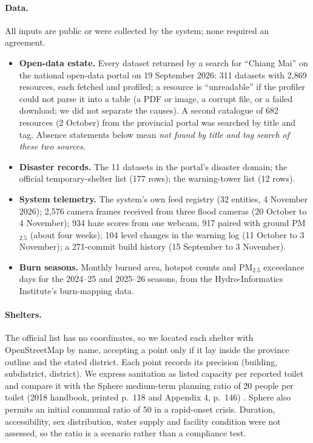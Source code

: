 \documentclass[10pt,twocolumn,a4paper]{article}
\newcommand{\kw}[1]{\textbf{#1}}
\begin{document}
\paragraph{Data.} All inputs are public or were collected by the system; none required an agreement.
\begin{itemize}
\item \kw{Open-data estate.} Every dataset returned by a search for ``Chiang Mai'' on the national open-data portal on 19 September 2026: 311 datasets with 2{,}869 resources, each fetched and profiled; a resource is ``unreadable'' if the profiler could not parse it into a table (a PDF or image, a corrupt file, or a failed download; we did not separate the causes). A second catalogue of 682 resources (2 October) from the provincial portal was searched by title and tag. Absence statements below mean \emph{not found by title and tag search of these two sources}.
\item \kw{Disaster records.} The 11 datasets in the portal's disaster domain; the official temporary-shelter list (177 rows); the warning-tower list (12 rows).
\item \kw{System telemetry.} The system's own feed registry (32 entities, 4 November 2026); 2,576 camera frames received from three flood cameras (20 October to 4 November); 934 haze scores from one webcam, 917 paired with ground PM$_{2.5}$ (about four weeks); 104 level changes in the warning log (11 October to 3 November); a 271-commit build history (15 September to 3 November).
\item \kw{Burn seasons.} Monthly burned area, hotspot counts and PM$_{2.5}$ exceedance days for the 2024--25 and 2025--26 seasons, from the Hydro-Informatics Institute's burn-mapping data.
\end{itemize}
\paragraph{Shelters.} The official list has no coordinates, so we located each shelter with OpenStreetMap by name, accepting a point only if it lay inside the province outline and the stated district. Each point records its precision (building, subdistrict, district). We express sanitation as listed capacity per reported toilet and compare it with the Sphere medium-term planning ratio of 20 people per toilet (2018 handbook, printed p.\ 118 and Appendix 4, p.\ 146) \citep{sphere2018}. Sphere also permits an initial communal ratio of 50 in a rapid-onset crisis. Duration, accessibility, sex distribution, water supply and facility condition were not assessed, so the ratio is a scenario rather than a compliance test.
\end{document}
